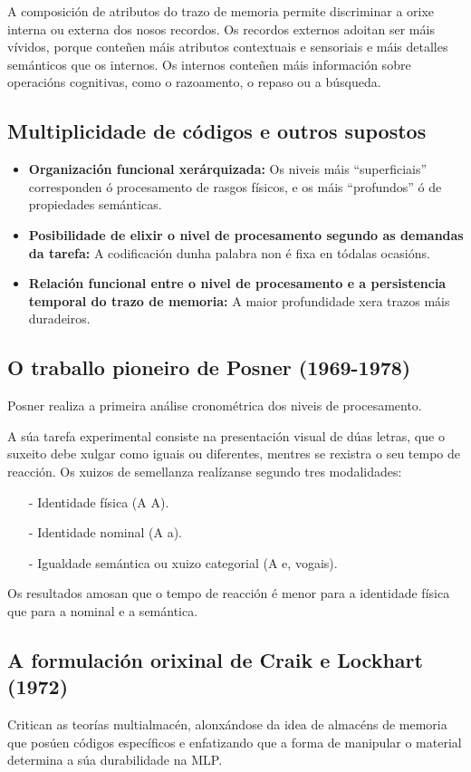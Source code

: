 \documentclass[a4paper,11pt]{article}
\begin{document}
A composición de atributos do trazo de memoria permite discriminar a orixe interna ou externa dos nosos recordos. Os recordos externos adoitan ser máis vívidos, porque conteñen máis atributos contextuais e sensoriais e máis detalles semánticos que os internos. Os internos conteñen máis información sobre operacións cognitivas, como o razoamento, o repaso ou a búsqueda.

\subsection{Multiplicidade de códigos e outros supostos}
\begin{itemize}
	\item \textbf{Organización funcional xerárquizada:} Os niveis máis ``superficiais'' corresponden
	ó procesamento de rasgos físicos, e os máis ``profundos'' ó de propiedades semánticas.
	\item \textbf{Posibilidade de elixir o nivel de procesamento segundo as demandas da tarefa:} A
	codificación dunha palabra non é fixa en tódalas ocasións.
	\item \textbf{Relación funcional entre o nivel de procesamento e a persistencia temporal do
	trazo de memoria:} A maior profundidade xera trazos máis duradeiros.
\end{itemize}

\subsection{O traballo pioneiro de Posner (1969-1978)}
Posner realiza a primeira análise cronométrica dos niveis de procesamento. 

A súa tarefa experimental consiste na presentación visual de dúas letras, que o suxeito debe xulgar como iguais ou diferentes, mentres se rexistra o seu tempo de reacción. Os xuizos de semellanza realízanse segundo tres modalidades:
\begin{itemize}
	\item[-] Identidade física (A A).
	\item[-] Identidade nominal (A a).
	\item[-] Igualdade semántica ou xuizo categorial (A e, vogais).
\end{itemize}

Os resultados amosan que o tempo de reacción é menor para a identidade física que para a nominal e a semántica.

\subsection{A formulación orixinal de Craik e Lockhart (1972)}
Critican as teorías multialmacén, alonxándose da idea de almacéns de memoria que posúen códigos específicos e enfatizando que a forma de manipular o material determina a súa durabilidade na MLP.
\end{document}
